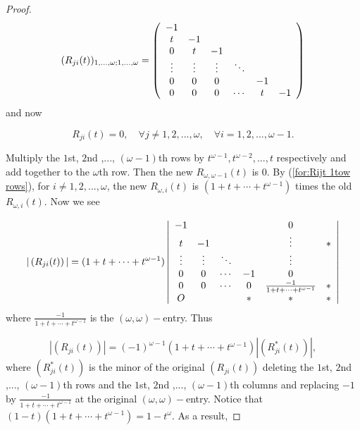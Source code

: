 \documentclass[10pt,a4paper]{amsart}
\begin{document}
\begin{proof}
\begin{equation}
(R_{ji}(t))_{1,...,\omega;1,...,\omega}=\left(\begin{array}[]{cccccc}
-1 & & & & \\
t & -1 & & & \\
0 & t & -1 & & \\
\vdots & \vdots & \vdots & \ddots & \\
0 & 0 & 0 & & -1 \\
0 & 0 & 0 & \cdots & t & -1
\end{array}\right)
\end{equation}
and now

\begin{equation}
R_{ji}(t)=0, \quad \forall j\neq 1,2,...,\omega, \quad \forall i=1,2,...,\omega-1. \nonumber
\end{equation}

Multiply the $1$st, $2$nd ,..., $(\omega-1)$th rows by $t^{\omega-1},t^{\omega-2},...,t$ respectively and add together to the $\omega$th row. Then the new $R_{\omega,\omega-1}(t)$ is $0$. By (\ref{for:Rijt 1tow rows}), for $i\neq 1,2,...,\omega$, the new $R_{\omega,i}(t)$ is $(1+t+\cdots+t^{\omega-1})$ times the old $R_{\omega,i}(t)$. Now we see

\begin{equation}
|\left(R_{ji}(t)\right)|=(1+t+\cdots+t^{\omega-1})\left|\begin{array}[]{cccccc}
-1 & & & & 0 & \\
t & -1 & & & \vdots & *\\
\vdots & \vdots & \ddots & & \vdots & \\
0 & 0 & \cdots & -1 & 0 &  \\
0 & 0 & \cdots & 0  & \frac{-1}{1+t+\cdots+t^{\omega-1}}  & * \\
O &   &        & *  & * & *
\end{array}\right|
\end{equation}
where $\frac{-1}{1+t+\cdots+t^{\omega-1}}$ is the $(\omega,\omega)-$entry. Thus

\begin{equation}
|\left(R_{ji}(t)\right)|=(-1)^{\omega-1}(1+t+\cdots+t^{\omega-1})|\left(R^{*}_{ji}(t)\right)|,
\end{equation}
where $(R^{*}_{ji}(t))$ is the minor of the original $(R_{ji}(t))$ deleting the $1$st, $2$nd ,..., $(\omega-1)$th rows and the $1$st, $2$nd ,..., $(\omega-1)$th columns and replacing $-1$ by $\frac{-1}{1+t+\cdots+t^{\omega-1}}$ at the original $(\omega,\omega)-$entry. Notice that $(1-t)(1+t+\cdots+t^{\omega-1})=1-t^{\omega}$. As a result,


\end{proof}
\end{document}
